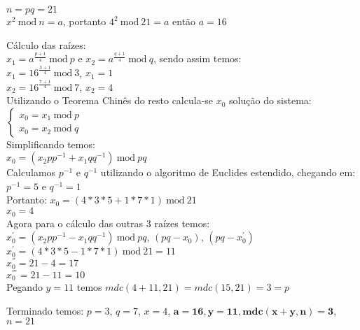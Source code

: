 \documentclass[12pt]{article}
\newcommand{\modd}{\ \text{mod}\ }
\begin{document}
\begin{itemize}
				$n = pq = 21$\\
				$x^2 \modd n = a$, portanto $4^2 \modd 21  = a$ então $a =  16$
				\newline
				\begin{center}
					Cálculo das raízes:\\
					$x_1 = a^{\frac{p+1}{4}} \modd p$	e 
					$x_2 = a^{\frac{q+1}{4}} \modd q$,
					sendo assim temos:\\
					$x_1 = 16^{\frac{3+1}{4}} \modd 3$, $x_1 = 1$\\
					$x_2 = 16^{\frac{7+1}{4}} \modd 7$, $x_2 = 4$\\
					Utilizando o Teorema Chinês do resto calcula-se $x_0$
					solução do sistema:
					$ \begin{cases} 
							x_0 = x_1 \modd p \\
							x_0 = x_2 \modd q 
						\end{cases}
					$\\
					Simplificando temos:\\
					$x_0 = (x_2pp^{-1} + x_1qq^{-1}) \modd pq$\\
					Calculamos $p^{-1}$ e $q^{-1}$ utilizando o algoritmo
					de Euclides estendido, chegando em:\\
					$p^{-1} = 5 $ e $q^{-1} = 1 $\\
					Portanto: $x_0 = (4*3*5 + 1*7*1) \modd 21$\\
					$x_0 = 4$\\
					Agora para o cálculo das outras 3 raízes temos:\\
					$x_0^{'} = (x_2pp^{-1} - x_1qq^{-1}) \modd pq$, $(pq - x_0)$,
					$(pq - x_0^{'})$\\
					$x_0^{'} = (4*3*5 - 1*7*1) \modd 21 = 11$\\
					$x_0^{''} = 21 - 4 = 17$\\
					$x_0^{'''} = 21 - 11 = 10$\\
					Pegando $y = 11$ temos $mdc(4+11, 21) = mdc(15, 21) = 3 = p$				
				\end{center} 	
				Terminado temos: 
				$p = 3$, $q = 7$, $x = 4$, $\mathbf{a = 16, y = 11, mdc(x + y, n) = 3}$,
				$n = 21$
		\end{itemize}
\end{document}
